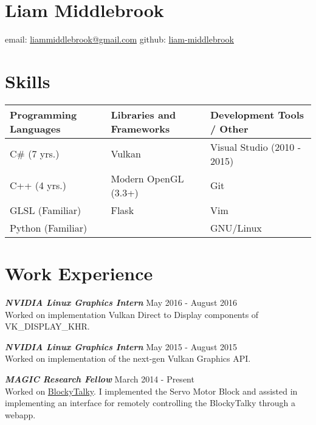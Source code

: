 \documentclass[line,margin]{res}
\begin{document}
\marginsize{.5in}{.5in}{.5in}{.5in}

\section{Liam Middlebrook}

\hfill email: \href{mailto:liammiddlebrook@gmail.com}{liammiddlebrook@gmail.com}
github: \href{https://github.com/liam-middlebrook}{liam-middlebrook}

\begin{resume}


\section{Skills}
\begin{table}[h]
\begin{tabular}{@{}lll@{}}
\toprule
Programming Languages & Libraries and Frameworks & Development Tools / Other   \\ \midrule
C\# (7 yrs.)          & Vulkan                   & Visual Studio (2010 - 2015) \\
C++ (4 yrs.)          & Modern OpenGL (3.3+)     & Git                         \\
GLSL (Familiar)       & Flask                    & Vim                         \\
Python (Familiar)     &                          & GNU/Linux                   \\ \bottomrule

\end{tabular}
\end{table}


\section{Work Experience}

{\textbf{\emph{NVIDIA Linux Graphics Intern}}} \hfill May 2016 - August 2016\\
Worked on implementation Vulkan Direct to Display components of VK\_DISPLAY\_KHR.

{\textbf{\emph{NVIDIA Linux Graphics Intern}}} \hfill May 2015 - August 2015\\
Worked on implementation of the next-gen Vulkan Graphics API.

{\textbf{\emph{MAGIC Research Fellow}}} \hfill March 2014 - Present\\
Worked on \href{https://github.com/liam-middlebrook/blockytalky.git}{BlockyTalky}. I implemented
the Servo Motor Block and assisted in implementing an interface for remotely controlling the
BlockyTalky through a webapp.


\end{resume}
\end{document}
